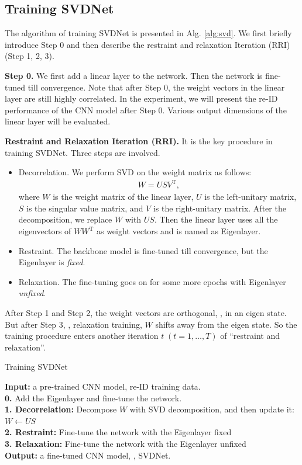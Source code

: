 \documentclass[10pt,twocolumn,letterpaper]{article}
\begin{document}
\subsection{Training SVDNet} \label{sec:training}
The algorithm of training SVDNet is presented in Alg. \ref{alg:svd}. We first briefly introduce Step 0 and then describe the restraint and relaxation Iteration (RRI) (Step 1, 2, 3).

\textbf{Step 0.} We first add a linear layer to the network. Then the network is fine-tuned till convergence. Note that after Step 0, the weight vectors in the linear layer are still highly correlated. In the experiment, we will present the re-ID performance of the CNN model after Step 0. Various output dimensions of the linear layer will be evaluated.

\textbf{Restraint and Relaxation Iteration (RRI).} It is the key procedure in training SVDNet. Three steps are involved.
\begin{itemize}
\item Decorrelation. We perform SVD on the weight matrix as follows:
\begin{align}
W=USV^\mathrm{T},
\label{eq:SVD0}
\end{align}
where $W$ is the weight matrix of the linear layer, $U$ is the left-unitary matrix, $S$ is the singular value matrix, and $V$ is the right-unitary matrix.
After the decomposition, we replace $W$ with $US$. Then the linear layer uses all the eigenvectors of $WW^\mathrm{T}$ as weight vectors and is named as Eigenlayer. 
\item Restraint. The backbone model is fine-tuned till convergence, but the Eigenlayer is \emph{fixed}.
\item Relaxation. The fine-tuning goes on for some more epochs with Eigenlayer \emph{unfixed}. 
\end{itemize}
 
After Step 1 and Step 2, the weight vectors are orthogonal, \ie, in an eigen state. But after Step 3, \ie, relaxation training, $W$ shifts away from the eigen state. So the training procedure enters another iteration $t\;(t = 1,\ldots,T)$ of ``restraint and relaxation''. 

\begin{algorithm}[t]
\caption{Training SVDNet}
\textbf{Input:} a pre-trained CNN model, re-ID training data.\\
\textbf{0.} Add the Eigenlayer and fine-tune the network.\\
{ 
\textbf{1. Decorrelation:} Decompose $W$ with SVD decomposition, and then update it: {$W \gets US$}\\
\textbf{2. Restraint:} Fine-tune the network with the Eigenlayer fixed \\
\textbf{3. Relaxation:} Fine-tune the network with the Eigenlayer unfixed \\
} 
\textbf{Output:} a fine-tuned CNN model, \ie, SVDNet.\\
\label{alg:svd}
\end{algorithm}
\end{document}
